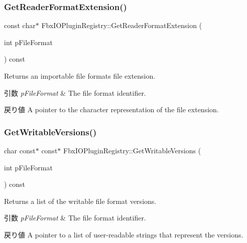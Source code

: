 \subsubsection{\texorpdfstring{Get\+Reader\+Format\+Extension()}{GetReaderFormatExtension()}}
{\footnotesize\ttfamily const char$\ast$ Fbx\+I\+O\+Plugin\+Registry\+::\+Get\+Reader\+Format\+Extension (\begin{DoxyParamCaption}\item[{int}]{p\+File\+Format }\end{DoxyParamCaption}) const}

Returns an importable file format\textquotesingle{}s file extension. 
\begin{DoxyParams}{引数}
{\em p\+File\+Format} & The file format identifier. \\
\hline
\end{DoxyParams}
\begin{DoxyReturn}{戻り値}
A pointer to the character representation of the file extension. 
\end{DoxyReturn}
\mbox{\label{class_fbx_i_o_plugin_registry_a37b01e6dc7991d69eb26dbfbd6e25e61}} 
\subsubsection{\texorpdfstring{Get\+Writable\+Versions()}{GetWritableVersions()}}
{\footnotesize\ttfamily char const$\ast$ const$\ast$ Fbx\+I\+O\+Plugin\+Registry\+::\+Get\+Writable\+Versions (\begin{DoxyParamCaption}\item[{int}]{p\+File\+Format }\end{DoxyParamCaption}) const}

Returns a list of the writable file format versions. 
\begin{DoxyParams}{引数}
{\em p\+File\+Format} & The file format identifier. \\
\hline
\end{DoxyParams}
\begin{DoxyReturn}{戻り値}
A pointer to a list of user-\/readable strings that represent the versions. 
\end{DoxyReturn}
\mbox{\label{class_fbx_i_o_plugin_registry_a2699c35cb6a8c2f8abab2167b1faa8fb}} 
